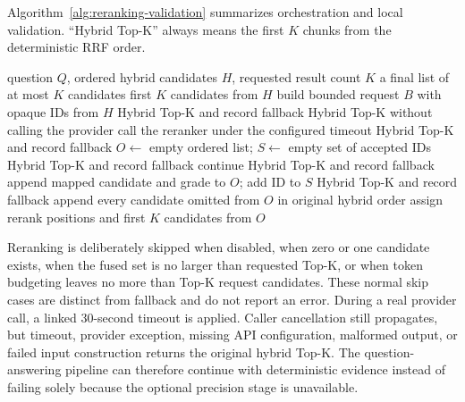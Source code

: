Algorithm~\ref{alg:reranking-validation} summarizes orchestration and local validation. ``Hybrid Top-K'' always means the first $K$ chunks from the deterministic RRF order.

\begin{algorithm}[!htbp]
	\caption{Bounded reranking validation with fail-open hybrid fallback}
	\label{alg:reranking-validation}
	\begin{algorithmic}[1]
		\Require question $Q$, ordered hybrid candidates $H$, requested result count $K$
		\Ensure a final list of at most $K$ candidates
			\State \Return first $K$ candidates from $H$
		\EndIf
		\State build bounded request $B$ with opaque IDs from $H$
			\State \Return Hybrid Top-K and record fallback
		\EndIf
			\State \Return Hybrid Top-K without calling the provider
		\EndIf
		\State call the reranker under the configured timeout
			\State \Return Hybrid Top-K and record fallback
		\EndIf
		\State $O\gets$ empty ordered list; $S\gets$ empty set of accepted IDs
				\State \Return Hybrid Top-K and record fallback
			\EndIf
				\State continue
			\EndIf
				\State \Return Hybrid Top-K and record fallback
			\EndIf
			\State append mapped candidate and grade to $O$; add ID to $S$
		\EndFor
			\State \Return Hybrid Top-K and record fallback
		\EndIf
		\State append every candidate omitted from $O$ in original hybrid order
		\State assign rerank positions and \Return first $K$ candidates from $O$
	\end{algorithmic}
\end{algorithm}

Reranking is deliberately skipped when disabled, when zero or one candidate exists, when the fused set is no larger than requested Top-K, or when token budgeting leaves no more than Top-K request candidates. These normal skip cases are distinct from fallback and do not report an error. During a real provider call, a linked 30-second timeout is applied. Caller cancellation still propagates, but timeout, provider exception, missing API configuration, malformed output, or failed input construction returns the original hybrid Top-K. The question-answering pipeline can therefore continue with deterministic evidence instead of failing solely because the optional precision stage is unavailable.

